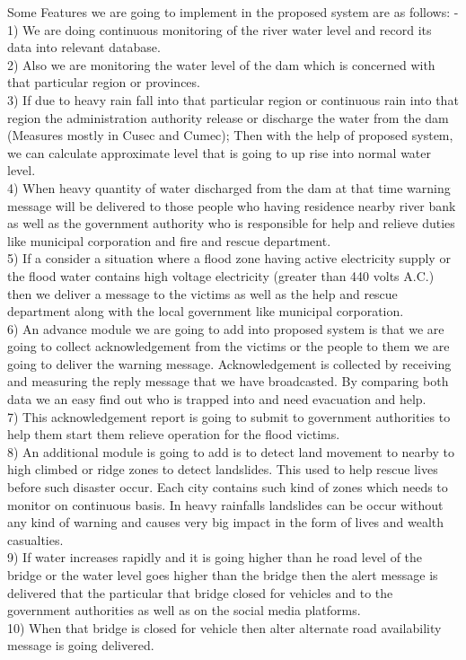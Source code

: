 \documentclass[a4paper,12pt]{report}
\begin{document}
Some Features we are going to implement in the proposed system are as follows: -\\
1)	We are doing continuous monitoring of the river water level and record its data into relevant database.\\
2)	Also we are monitoring the water level of the dam which is concerned with that particular region or provinces.\\
3)	If due to heavy rain fall into that particular region or continuous rain into that region the administration authority release or discharge the water from the dam (Measures mostly in Cusec and Cumec); Then with the help of proposed system, we can calculate approximate level that is going to up rise into normal water level.\\
4)	When heavy quantity of water discharged from the dam at that time warning message will be delivered to those people who having residence nearby river bank as well as the government authority who is responsible for help and relieve duties like municipal corporation and fire and rescue department.\\
5)	If a consider a situation where a flood zone having active electricity supply or the flood water contains high voltage electricity (greater than 440 volts A.C.) then we deliver a message to the victims as well as the help and rescue department along with the local government like municipal corporation.\\
6)	An advance module we are going to add into proposed system is that we are going to collect acknowledgement from the victims or the people to them we are going to deliver the warning message. Acknowledgement is collected by receiving and measuring the reply message that we have broadcasted. By comparing both data we an easy find out who is trapped into and need evacuation and help.\\
7)	This acknowledgement report is going to submit to government authorities to help them start them relieve operation for the flood victims.\\
8)	An additional module is going to add is to detect land movement to nearby to high climbed or ridge zones to detect landslides. This used to help rescue lives before such disaster occur. Each city contains such kind of zones which needs to monitor on continuous basis. In heavy rainfalls landslides can be occur without any kind of warning and causes very big impact in the form of lives and wealth casualties.\\
9)	If water increases rapidly and it is going higher than he road level of the bridge or the water level goes higher than the bridge then the alert message is delivered that the particular that bridge closed for vehicles and to the government authorities as well as on the social media platforms.\\
10)	When that bridge is closed for vehicle then alter alternate road availability message is going delivered.
 
\end{document}
